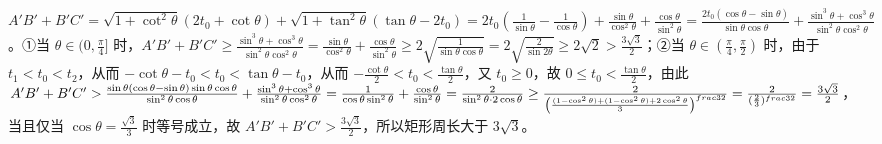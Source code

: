 \begin{question}[points=12]
\begin{solution}
$A'B'+B'C'=\sqrt{1+\cot^2\theta}(2t_0+\cot\theta)+\sqrt{1+\tan^2\theta}(\tan\theta-2t_0)=2t_0(\frac{1}{\sin\theta}-\frac{1}{\cos\theta})+\frac{\sin\theta}{\cos^2\theta}+\frac{\cos\theta}{\sin^2\theta}=\frac{2t_0(\cos\theta-\sin\theta)}{\sin\theta\cos\theta}+\frac{\sin^3\theta+\cos^3\theta}{\sin^2\theta\cos^2\theta}$。①当 $\theta\in(0,\frac{\pi}{4}]$ 时，$A'B'+B'C'\geq \frac{\sin^3\theta+\cos^3\theta}{\sin^2\theta\cos^2\theta}=\frac{\sin\theta}{\cos^2\theta}+\frac{\cos\theta}{\sin^2\theta}\geq 2\sqrt{\frac{1}{\sin\theta\cos\theta}}=2\sqrt{\frac{2}{\sin2\theta}}\geq 2\sqrt{2}>\frac{3\sqrt{3}}{2}$；②当 $\theta\in(\frac{\pi}{4},\frac{\pi}{2})$ 时，由于 $t_1<t_0<t_2$，从而 $-\cot\theta-t_0<t_0<\tan\theta-t_0$，从而 $-\frac{\cot\theta}{2}<t_0<\frac{\tan\theta}{2}$，又 $t_0\geq 0$，故 $0\leq t_0<\frac{\tan\theta}{2}$，由此 $A'B'+B'C'> \frac{\sin\theta(\cos\theta-\sin\theta)\sin\theta\cos\theta}{\sin^2\theta\cos\theta}+\frac{\sin^3\theta+\cos^3\theta}{\sin^2\theta\cos^2\theta}=\frac{1}{\cos\theta\sin^2\theta}+\frac{\cos\theta}{\sin^2\theta}=\frac{2}{\sin^2\theta\cdot2\cos\theta}\geq \frac{2}{\left(\frac{(1-\cos^2\theta)+(1-\cos^2\theta)+2\cos^2\theta}{3}\right)^{\\frac{3}{2}}}=\frac{2}{(\frac{2}{3})^{\\frac{3}{2}}}=\frac{3\sqrt{3}}{2}$，当且仅当 $\cos\theta=\frac{\sqrt{3}}{3}$ 时等号成立，故 $A'B'+B'C'>\frac{3\sqrt{3}}{2}$，所以矩形周长大于 $3\sqrt{3}$。
\end{solution}
\end{question}

